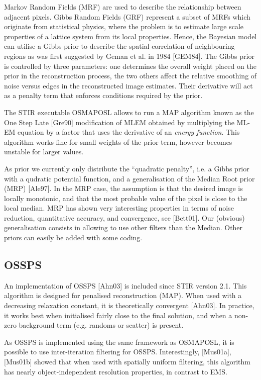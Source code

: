 \documentclass{article}
\begin{document}
Markov Random Fields (MRF) are used to describe the relationship 
between adjacent pixels. Gibbs Random Fields (GRF) represent 
a subset of MRFs which originate from statistical physics, where 
the problem is to estimate large scale properties of a lattice 
system from its local properties. Hence, the Bayesian model can 
utilise a Gibbs prior to describe the spatial correlation of 
neighbouring regions as was first suggested by Geman et al. in 
1984 [GEM84]. The Gibbs prior is controlled by three parameters: 
one determines the overall weight placed on the prior in the 
reconstruction process, the two others affect the relative smoothing 
of noise versus edges in the reconstructed image estimates. Their 
derivative will act as a penalty term that enforces conditions 
required by the prior.

The STIR executable OSMAPOSL allows to run a MAP algorithm 
known as the One Step Late [Gre90] modification of MLEM obtained 
by multiplying the ML-EM equation by a factor that uses the derivative 
of an \textit{energy function}. This algorithm works fine 
for small weights of the prior term, however becomes unstable 
for larger values. 

As prior we currently only distribute the ``quadratic penalty'', i.e. a
Gibbs prior with a qudratic potential function, and a generalisation of the 
Median Root prior (MRP) [Ale97]. In the MRP case, the assumption 
is that the desired image is locally monotonic, and that the 
most probable value of the pixel is close to the local median. 
MRP has shown very interesting properties in terms of noise reduction, 
quantitative accuracy, and convergence, see [Bett01]. Our (obvious) 
generalisation consists in allowing to use other filters than 
the Median. Other priors can easily be added with some coding. 


\subsection{OSSPS}
An implementation of OSSPS [Ahn03] is included since STIR version 2.1. 
This algorithm is designed for penalised reconstruction (MAP). When used
with a decreasing relaxation constant, it is theoretically convergent [Ahn03].
In practice, it works best when initialised fairly close to the final solution,
and when a non-zero background term (e.g. randoms or scatter) is present.

As OSSPS is implemented using the same framework as OSMAPOSL, it is possible
to use inter-iteration filtering for OSSPS. Interestingly, 
[Mus01a],[Mus01b] showed that when used with spatially uniform filtering,
this algorithm has nearly object-independent
resolution properties, in contrast to EMS.
\end{document}
